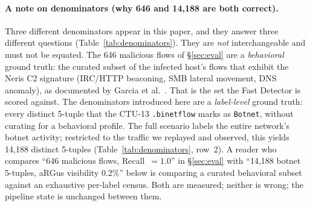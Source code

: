 \documentclass[11pt,a4paper]{article}
\begin{document}
    \paragraph{A note on denominators (why 646 and 14{,}188 are both correct).}
    Three different denominators appear in this paper, and they answer three different
    questions (Table~\ref{tab:denominators}). They are \emph{not} interchangeable and must not
    be equated. The 646 malicious flows of \S\ref{sec:eval} are a \emph{behavioral} ground
    truth: the curated subset of the infected host's flows that exhibit the Neris C2 signature
    (IRC/HTTP beaconing, SMB lateral movement, DNS anomaly), as documented by
    Garcia et al.~\cite{garcia2014}. That is the set the Fast Detector is scored against. The
    denominators introduced here are a \emph{label-level} ground truth: every distinct 5-tuple
    that the CTU-13 \texttt{.binetflow} marks as \texttt{Botnet}, without curating for a
    behavioral profile. The full scenario labels the entire network's botnet activity;
    restricted to the traffic we replayed and observed, this yields 14{,}188 distinct 5-tuples
    (Table~\ref{tab:denominators}, row~2). A reader who compares ``646 malicious flows,
    Recall~$=1.0$'' in \S\ref{sec:eval} with ``14{,}188 botnet 5-tuples, aRGus visibility
    0.2\%'' below is comparing a curated behavioral subset against an exhaustive per-label
    census. Both are measured; neither is wrong; the pipeline state is unchanged between them.
\end{document}

